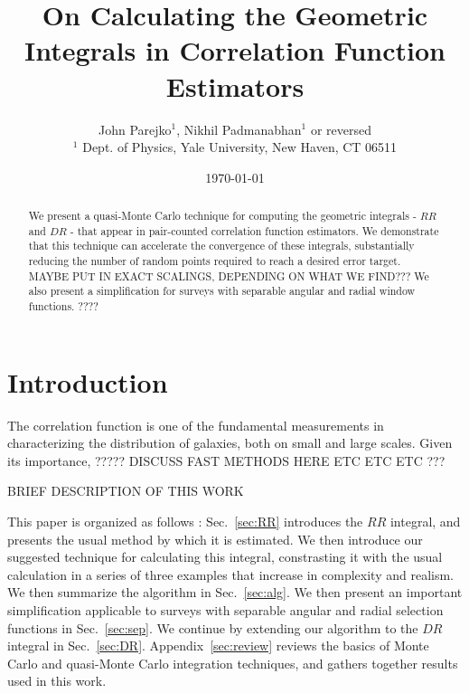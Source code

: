 \documentclass[usenatbib]{mn2e}
\begin{document}
\topmargin-1cm

\newcommand{\vx}{{\bm x}}
\newcommand{\vr}{{\bm r}}
\newcommand{\vdx}{{\bm dx}}
\newcommand{\vy}{{\bm y}}
\newcommand{\bin}{\Theta}


\title[Geometric Integrals for Correlation Functions]
{On Calculating the Geometric Integrals in Correlation Function Estimators}
\author[Parejko\&Padmanabhan]{John Parejko$^{1}$, Nikhil Padmanabhan$^{1}$ or
reversed \\
$^{1}$ Dept. of Physics, Yale University, New Haven, CT 06511 \\
}

\date{\today}
\maketitle

\begin{abstract}
  We present a quasi-Monte Carlo technique for computing the geometric integrals - $RR$ and $DR$ - that appear
  in pair-counted correlation function estimators. We demonstrate that this technique can accelerate the convergence of
  these integrals, substantially reducing the number of random points required
  to reach a desired error target. MAYBE PUT IN EXACT SCALINGS, DEPENDING ON
  WHAT WE FIND??? We also present a simplification for surveys with separable
  angular and radial window functions. ????
\end{abstract}

\section{Introduction}

The correlation function is one of the fundamental measurements in
characterizing the distribution of galaxies, both on small and large scales.
Given its importance, ????? DISCUSS FAST METHODS HERE ETC ETC ETC ???

BRIEF DESCRIPTION OF THIS WORK

This paper is organized as follows : Sec.~\ref{sec:RR} introduces the $RR$
integral, and presents the usual method by which it is estimated. We then
introduce our suggested technique for calculating this integral, constrasting it
with the usual calculation in a series of three examples that increase in
complexity and realism. We then summarize the algorithm in Sec.~\ref{sec:alg}.
We then present an important simplification applicable to surveys with separable
angular and radial selection functions in Sec.~\ref{sec:sep}.
We continue by extending our algorithm to the $DR$ integral in
Sec.~\ref{sec:DR}. Appendix~\ref{sec:review} reviews the basics of Monte Carlo and quasi-Monte
Carlo integration techniques, and gathers together results used in this work.
\end{document}
